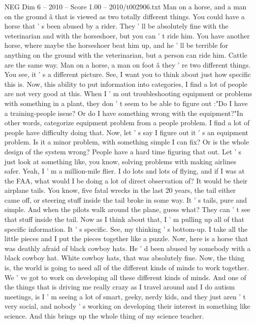\begin{textsample}{NEG Dim 6 – 2010 – Score 1.00 – 2010/t002906.txt}
Man on a horse, and a man on the ground â that is viewed as two totally different things.
You could have a horse that ' s been abused by a rider.
They ' ll be absolutely fine with the veterinarian and with the horseshoer, but you can ' t ride him.
You have another horse, where maybe the horseshoer beat him up, and he ' ll be terrible for anything on the ground with the veterinarian, but a person can ride him.
Cattle are the same way.
Man on a horse, a man on foot â they ' re two different things.
You see, it ' s a different picture.
See, I want you to think about just how specific this is.
Now, this ability to put information into categories, I find a lot of people are not very good at this.
When I ' m out troubleshooting equipment or problems with something in a plant, they don ' t seem to be able to figure out :"Do I have a training-people issue?
Or do I have something wrong with the equipment?"In other words, categorize equipment problem from a people problem.
I find a lot of people have difficulty doing that.
Now, let ' s say I figure out it ' s an equipment problem.
Is it a minor problem, with something simple I can fix?
Or is the whole design of the system wrong?
People have a hard time figuring that out.
Let ' s just look at something like, you know, solving problems with making airlines safer.
Yeah, I ' m a million-mile flier.
I do lots and lots of flying, and if I was at the FAA, what would I be doing a lot of direct observation of?
It would be their airplane tails.
You know, five fatal wrecks in the last 20 years, the tail either came off, or steering stuff inside the tail broke in some way.
It ' s tails, pure and simple.
And when the pilots walk around the plane, guess what?
They can ' t see that stuff inside the tail.
Now as I think about that, I ' m pulling up all of that specific information.
It ' s specific.
See, my thinking ' s bottom-up.
I take all the little pieces and I put the pieces together like a puzzle.
Now, here is a horse that was deathly afraid of black cowboy hats.
He ' d been abused by somebody with a black cowboy hat.
White cowboy hats, that was absolutely fine.
Now, the thing is, the world is going to need all of the different kinds of minds to work together.
We ' ve got to work on developing all these different kinds of minds.
And one of the things that is driving me really crazy as I travel around and I do autism meetings, is I ' m seeing a lot of smart, geeky, nerdy kids, and they just aren ' t very social, and nobody ' s working on developing their interest in something like science.
And this brings up the whole thing of my science teacher.

\end{textsample}

